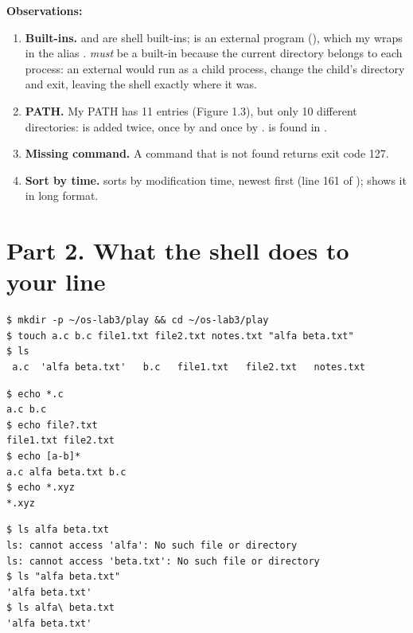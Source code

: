 \documentclass[11pt,a4paper]{article}
\begin{document}
\textbf{Observations:}
\begin{enumerate}
  \item \textbf{Built-ins.}  and  are shell built-ins;  is an
  external program (), which my  wraps in the alias
  .  \emph{must} be a built-in because the current directory
  belongs to each process: an external  would run as a child process, change the
  child's directory and exit, leaving the shell exactly where it was.
  \item \textbf{PATH.} My PATH has 11 entries (Figure 1.3), but only 10 different
  directories:  is added twice, once by  and once by
  .  is found in .
  \item \textbf{Missing command.} A command that is not found returns exit code 127.
  \item \textbf{Sort by time.}  sorts by modification time, newest first (line 161
  of );  shows it in long format.
\end{enumerate}

\section{Part 2. What the shell does to your line}

\begin{lstlisting}[caption={Files created in the play directory}]
$ mkdir -p ~/os-lab3/play && cd ~/os-lab3/play
$ touch a.c b.c file1.txt file2.txt notes.txt "alfa beta.txt"
$ ls
 a.c  'alfa beta.txt'   b.c   file1.txt   file2.txt   notes.txt
\end{lstlisting}

\begin{lstlisting}[caption={Globbing results}]
$ echo *.c
a.c b.c
$ echo file?.txt
file1.txt file2.txt
$ echo [a-b]*
a.c alfa beta.txt b.c
$ echo *.xyz
*.xyz
\end{lstlisting}

\begin{lstlisting}[caption={The ls error on a name with a space, and the fix}]
$ ls alfa beta.txt
ls: cannot access 'alfa': No such file or directory
ls: cannot access 'beta.txt': No such file or directory
$ ls "alfa beta.txt"
'alfa beta.txt'
$ ls alfa\ beta.txt
'alfa beta.txt'
\end{lstlisting}
\end{document}
